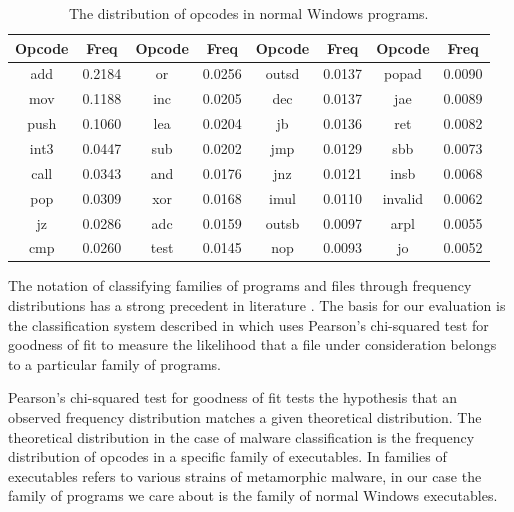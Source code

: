     \begin{table}
        \centering
        \begin{tabular}{|c|c||c|c||c|c||c|c|}
            \hline
            Opcode & Freq & Opcode & Freq & Opcode & Freq & Opcode & Freq \\
            \hline
            add & 0.2184 & or & 0.0256 & outsd & 0.0137 & popad & 0.0090 \\
            \hline
            mov & 0.1188 & inc & 0.0205 & dec & 0.0137 & jae & 0.0089 \\
            \hline
           push & 0.1060 & lea & 0.0204 & jb & 0.0136 & ret & 0.0082 \\
            \hline
           int3 & 0.0447 & sub & 0.0202 & jmp & 0.0129 & sbb & 0.0073 \\
            \hline
           call & 0.0343 & and & 0.0176 & jnz & 0.0121 & insb & 0.0068 \\
            \hline
            pop & 0.0309 & xor & 0.0168 & imul & 0.0110 & invalid & 0.0062 \\ 
            \hline
             jz & 0.0286 & adc & 0.0159 & outsb & 0.0097 & arpl & 0.0055 \\ 
            \hline
            cmp & 0.0260 & test & 0.0145 & nop & 0.0093 & jo & 0.0052 \\
            \hline
        \end{tabular}
        \caption{The distribution of opcodes in normal Windows programs.}
        \label{tab:results-windows-dist}
    \end{table}

    The notation of classifying families of programs and files through frequency
    distributions has a strong precedent in literature
    \cite{chisquared,hmm_evade,stat_model,fileprints}. The basis for our
    evaluation is the classification system described in \cite{chisquared} which
    uses Pearson's chi-squared test for goodness of fit to measure the
    likelihood that a file under consideration belongs to a particular family of
    programs.

    Pearson's chi-squared test for goodness of fit tests the hypothesis that
    an observed frequency distribution matches a given theoretical
    distribution. The theoretical distribution in the case of malware
    classification is the frequency distribution of opcodes in a specific
    family of executables. In \cite{chisquared} families of executables
    refers to various strains of metamorphic malware, in our case the family
    of programs we care about is the family of normal Windows executables.
    

